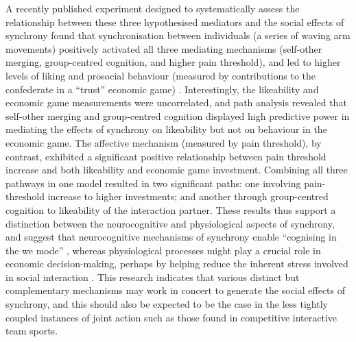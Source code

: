 A recently published experiment designed to systematically assess the relationship between these three hypothesised mediators and the social effects of synchrony found that synchronisation between individuals (a series of waving arm movements) positively activated all three mediating mechanisms (self-other merging, group-centred cognition, and higher pain threshold), and led to higher levels of liking and prosocial behaviour (measured by contributions to the confederate in a ``trust'' economic game) \citep{Lang2017}.  Interestingly, the likeability and economic game measurements were uncorrelated, and path analysis revealed that self-other merging and group-centred cognition displayed high predictive power
in mediating the effects of synchrony on likeability but not on behaviour in the economic game.  The affective mechanism (measured by pain threshold), by contrast, exhibited a significant positive relationship between pain threshold increase and both likeability and economic game investment.  Combining all three pathways in one model resulted in two significant paths: one involving pain-threshold increase to higher investments; and another through group-centred cognition to likeability of the interaction partner. These results thus support a distinction between the neurocognitive and physiological aspects of synchrony, and suggest that neurocognitive mechanisms of synchrony enable ``cognising in the we mode'' \citep{Gallotti2013,Hasson2016,Kirschner2010}, whereas physiological processes might play a crucial role in economic decision-making, perhaps by helping reduce the inherent stress involved in social interaction \citep{Mogan2017,Kret2015,Stanley2011}.
This research indicates that various distinct but complementary mechanisms may work in concert to generate the social effects of synchrony, and this should also be expected to be the case in the less tightly coupled instances of joint action such as those found in competitive interactive team sports.





